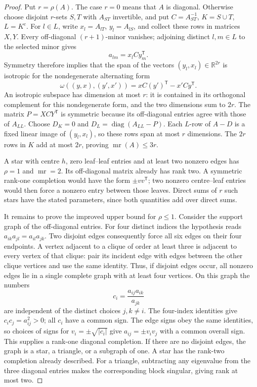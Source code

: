 \begin{proof}
Put \(r=\rho(A)\).  The case \(r=0\) means that \(A\) is
diagonal.  Otherwise choose disjoint \(r\)-sets \(S,T\)
with \(A_{ST}\) invertible, and put \(C=A_{ST}^{-1}\),
\(K=S\cup T\), \(L=K^c\).
For \(l\in L\), write \(x_l=A_{lT}\), \(y_l=A_{lS}\),
and collect these rows in matrices \(X,Y\).
Every off-diagonal \((r+1)\)-minor vanishes; adjoining
distinct \(l,m\in L\) to the selected minor gives
\[
 a_{lm}=x_lCy_m^{\mathsf T}.
\]
Symmetry therefore implies that the span of the vectors
\((y_l,x_l)\in\mathbb R^{2r}\) is isotropic for the
nondegenerate alternating form
\[
 \omega((y,x),(y',x'))=xC(y')^{\mathsf T}-x'Cy^{\mathsf T}.
\]
An isotropic subspace has dimension at most \(r\):
it is contained in its orthogonal complement for this
nondegenerate form, and the two dimensions sum to \(2r\).
The matrix \(P=XCY^{\mathsf T}\) is symmetric because its
off-diagonal entries agree with those of \(A_{LL}\).
Choose \(D_K=0\) and
\(D_L=\operatorname{diag}(A_{LL}-P)\).
Each \(L\)-row of \(A-D\) is a fixed linear image of
\((y_l,x_l)\), so these rows span at most \(r\) dimensions.
The \(2r\) rows in \(K\) add at most \(2r\), proving
\(\operatorname{mr}(A)\leq3r\).

A star with centre \(h\), zero leaf--leaf entries and at
least two nonzero edges has \(\rho=1\) and
\(\operatorname{mr}=2\).  Its off-diagonal matrix already
has rank two.  A symmetric rank-one completion would have
the form \(\pm vv^{\mathsf T}\); two nonzero centre--leaf
entries would then force a nonzero entry between those
leaves.  Direct sums of \(r\) such stars have the stated
parameters, since both quantities add over direct sums.

It remains to prove the improved upper bound for \(\rho\leq1\).
Consider the support graph of the off-diagonal entries.
For four distinct indices the hypothesis reads
\(a_{ik}a_{jl}=a_{il}a_{jk}\).
Two disjoint edges consequently force all six edges on their
four endpoints.  A vertex adjacent to a clique of order at
least three is adjacent to every vertex of that clique:
pair its incident edge with edges between the other clique
vertices and use the same identity.
Thus, if disjoint edges occur, all nonzero edges lie in a
single complete graph with at least four vertices.
On this graph the numbers
\[
 c_i=\frac{a_{ij}a_{ik}}{a_{jk}}
\]
are independent of the distinct choices \(j,k\ne i\).
The four-index identities give \(c_ic_j=a_{ij}^2>0\);
all \(c_i\) have a common sign.  The edge signs obey the
same identities, so choices of signs for
\(v_i=\pm\sqrt{|c_i|}\) give \(a_{ij}=\pm v_iv_j\)
with a common overall sign.  This supplies a rank-one
diagonal completion.  If there are no disjoint edges,
the graph is a star, a triangle, or a subgraph of one.
A star has the rank-two completion already described.
For a triangle, subtracting any eigenvalue from the three
diagonal entries makes the corresponding block singular,
giving rank at most two.
\end{proof}

